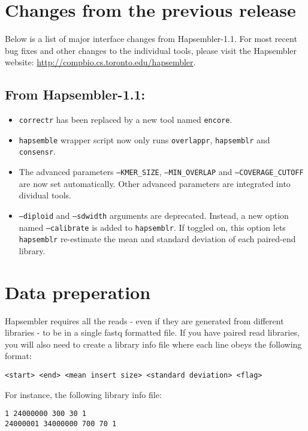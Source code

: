 \documentclass[12pt,a4paper]{report}
\begin{document}
\section{Changes from the previous release}

Below is a list of major interface changes from Hapsembler-1.1. For most recent bug fixes and other changes to the individual tools, please visit the Hapsembler website:  \url{http://compbio.cs.toronto.edu/hapsembler}.

\subsection{From Hapsembler-1.1:}

\begin{itemize}
\item \texttt{correctr} has been replaced by a new tool named \texttt{encore}.
\item \texttt{hapsemble} wrapper script now only runs \texttt{overlappr}, \texttt{hapsemblr} and \texttt{consensr}.
\item The advanced parameters \texttt{--KMER\_SIZE}, \texttt{--MIN\_OVERLAP} and \texttt{--COVERAGE\_CUTOFF} are now set automatically. Other advanced parameters are integrated into dividual tools.
\item \texttt{--diploid} and \texttt{--sdwidth} arguments are deprecated. Instead, a new option named \texttt{--calibrate} is added to \texttt{hapsemblr}. If toggled on, this option lets \texttt{hapsemblr} re-estimate the mean and standard deviation of each paired-end library.
\end{itemize}

\section{Data preperation}
\label{data}

Hapsembler requires all the reads - even if they are generated from different libraries - to be in a single fastq formatted file. If you have paired read libraries, you will also need to create a library info file where each line obeys the following format:

\begin{verbatim}
<start> <end> <mean insert size> <standard deviation> <flag>
\end{verbatim}

For instance, the following library info file:

\begin{verbatim}
1 24000000 300 30 1
24000001 34000000 700 70 1
\end{verbatim}
\end{document}
